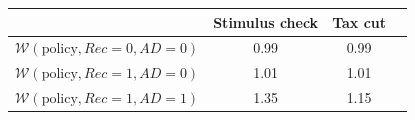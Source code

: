 \begin{tabular}{@{}lccc@{}}
\toprule
                          & Stimulus check & Tax cut \\ \midrule
$\mathcal{W}(\text{policy}, Rec=0, AD=0)$ & 0.99 & 0.99 \\
$\mathcal{W}(\text{policy}, Rec=1, AD=0)$ & 1.01  & 1.01 \\
$\mathcal{W}(\text{policy}, Rec=1, AD=1)$ & 1.35 & 1.15 \\ \bottomrule
\end{tabular}
